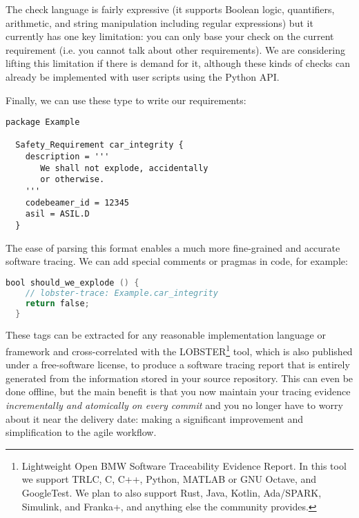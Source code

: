 \documentclass[english]{lni}
\begin{document}
The check language is fairly expressive (it supports Boolean logic,
quantifiers, arithmetic, and string manipulation including regular
expressions) but it currently has one key limitation: you can only
base your check on the current requirement (i.e. you cannot talk about
other requirements). We are considering lifting this limitation if
there is demand for it, although these kinds of checks can already be
implemented with user scripts using the Python API.

Finally, we can use these type to write our requirements:
\begin{lstlisting}[gobble=2,language=TRLC]
  package Example

  Safety_Requirement car_integrity {
    description = '''
       We shall not explode, accidentally
       or otherwise.
    '''
    codebeamer_id = 12345
    asil = ASIL.D
  }
\end{lstlisting}


The ease of parsing this format enables a much more fine-grained and
accurate software tracing. We can add special comments or pragmas in
code, for example:
\begin{lstlisting}[language=C,gobble=2]
  bool should_we_explode () {
    // lobster-trace: Example.car_integrity
    return false;
  }
\end{lstlisting}

These tags can be extracted for any reasonable implementation language
or framework and cross-correlated with the
LOBSTER\footnote{Lightweight Open BMW Software Traceability Evidence
  Report. In this tool we support TRLC, C, C++, Python, MATLAB or GNU
  Octave, and GoogleTest. We plan to also support Rust, Java, Kotlin,
  Ada/SPARK, Simulink, and Franka+, and anything else the community
  provides.} tool, which is also published under a free-software
license, to produce a software tracing report that is entirely
generated from the information stored in your source repository. This
can even be done offline, but the main benefit is that you now
maintain your tracing evidence \emph{incrementally and atomically on
  every commit} and you no longer have to worry about it near the
delivery date: making a significant improvement and simplification to
the agile workflow.
\end{document}
